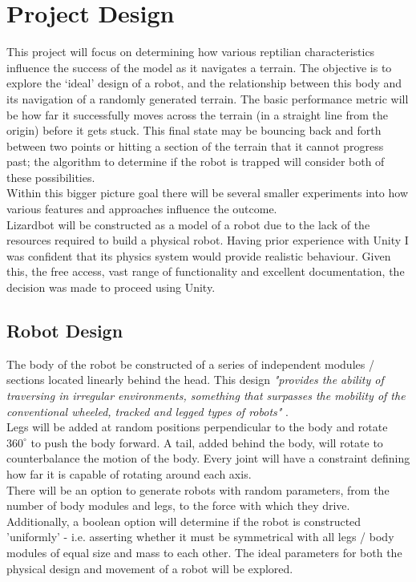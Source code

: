 \documentclass{article}
\begin{document}
\section{Project Design}
\label{sec:Project Aims}
This project will focus on determining how various reptilian characteristics influence the success of the model as it navigates a terrain. The objective is to explore the ‘ideal’ design of a robot, and the relationship between this body and its navigation of a randomly generated terrain. The basic performance metric will be how far it successfully moves across the terrain (in a straight line from the origin) before it gets stuck. This final state may be bouncing back and forth between two points or hitting a section of the terrain that it cannot progress past; the algorithm to determine if the robot is trapped will consider both of these possibilities. \\
Within this bigger picture goal there will be several smaller experiments into how various features and approaches influence the outcome. \\

Lizardbot will be constructed as a model of a robot due to the lack of the resources required to build a physical robot. Having prior experience with Unity  I was confident that its physics system would provide realistic behaviour. Given this, the free access, vast range of functionality and excellent documentation, the decision was made to proceed using Unity. \\

\subsection{Robot Design}
\label{sec:Robot Design}
The body of the robot be constructed of a series of independent modules / sections located linearly behind the head. This design \textit{"provides the ability of traversing in irregular environments, something that surpasses the mobility of the conventional wheeled, tracked and legged types of robots"} .\\
Legs will be added at random positions perpendicular to the body and rotate $360^\circ$ to push the body forward. A tail, added behind the body, will rotate to counterbalance the motion of the body. Every joint will have a constraint defining how far it is capable of rotating around each axis. \\

There will be an option to generate robots with random parameters, from the number of body modules and legs, to the force with which they drive. Additionally, a boolean option will determine if the robot is constructed 'uniformly' - i.e. asserting whether it must be symmetrical with all legs / body modules of equal size and mass to each other. The ideal parameters for both the physical design and movement of a robot will be explored.\\
\end{document}
